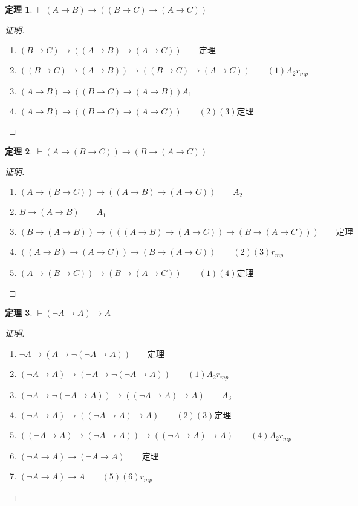 \documentclass{article}
\newtheorem{Thm}{定理}
\begin{document}
\begin{CJK*}{UTF8}{gbsn}
  \begin{Thm}$\vdash (A\to B) \to ((B\to C)\to (A\to C))$\end{Thm}
  \begin{proof}[证明]$\quad$
    \begin{enumerate}
      \item  $(B\to C)\to ((A\to B)\to (A\to C))\qquad \text{定理}$
      \item $((B\to C)\to (A\to B))\to ((B\to C)\to (A\to C))\quad\quad (1)A_2 r_{mp}$
      \item $(A\to B) \to ((B\to C)\to (A\to B)) A_1$
      \item $(A\to B) \to ((B\to C)\to (A\to C)) \quad\quad(2)(3)\text{定理}$
    \end{enumerate}
  \end{proof}

  \begin{Thm}$\vdash (A\to(B\to C))\to (B\to (A\to C))$\end{Thm}
  \begin{proof}[证明]$\quad$
    \begin{enumerate}
      \item $(A\to(B\to C))\to ((A\to B)\to (A\to C))\quad\quad A_2$
      \item $B\to (A\to B) \quad\quad A_1$
      \item $(B\to (A\to B)) \to (((A\to B)\to (A\to C))\to (B\to (A\to C)))\qquad\text{定理}$
      \item $((A\to B)\to (A\to C))\to (B\to (A\to C))\quad\quad (2)(3)r_{mp}$
      \item $(A\to(B\to C))\to (B\to (A\to C))\quad\quad (1)(4)\text{定理}$
    \end{enumerate}
  \end{proof}

  \begin{Thm}$\vdash(\lnot A\to A)\to A$\end{Thm}
  \begin{proof}[证明]$\quad$
    \begin{enumerate}
      \item $\lnot A \to (A \to \lnot(\lnot A\to A))\qquad$定理
      \item $(\lnot A\to A)\to (\lnot A \to \lnot(\lnot A\to A))\qquad (1)A_2r_{mp}$
      \item $(\lnot A \to \lnot(\lnot A\to A))\to ((\lnot A\to A)\to A)\qquad A_3$
      \item  $(\lnot A\to A)\to ((\lnot A\to A)\to A)\qquad (2)(3)$定理
      \item $((\lnot A\to A)\to (\lnot A\to A))\to ((\lnot A\to A)\to A)\qquad (4)A_2r_{mp}$
      \item $(\lnot A\to A)\to (\lnot A\to A)\qquad$定理
      \item $(\lnot A\to A)\to A\qquad (5)(6)r_{mp}$
    \end{enumerate}
  \end{proof}


\end{CJK*}
\end{document}
